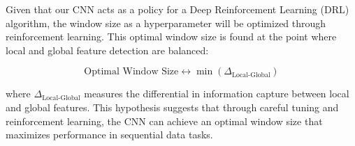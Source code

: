 Given that our CNN acts as a policy for a Deep Reinforcement Learning (DRL) algorithm, the window size as a hyperparameter will be optimized through reinforcement learning. This optimal window size is found at the point where local and global feature detection are balanced:

\[
\text{Optimal Window Size} \leftrightarrow \min \left( \Delta_{\text{Local-Global}} \right)
\]

where \( \Delta_{\text{Local-Global}} \) measures the differential in information capture between local and global features. This hypothesis suggests that through careful tuning and reinforcement learning, the CNN can achieve an optimal window size that maximizes performance in sequential data tasks.

